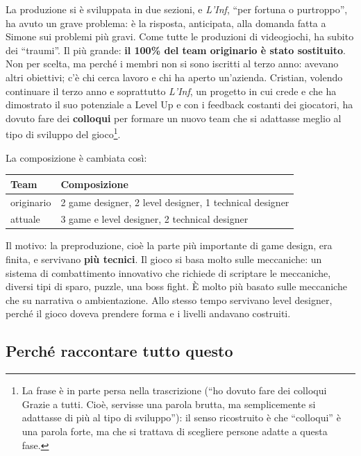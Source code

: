 La produzione si è sviluppata in due sezioni, e \emph{L'Inf}, ``per fortuna o
purtroppo'', ha avuto un grave problema: è la risposta, anticipata, alla
domanda fatta a Simone sui problemi più gravi. Come tutte le produzioni di
videogiochi, ha subito dei ``traumi''. Il più grande: \textbf{il 100\% del
team originario è stato sostituito}. Non per scelta, ma perché i membri non si
sono iscritti al terzo anno: avevano altri obiettivi; c'è chi cerca lavoro e
chi ha aperto un'azienda. Cristian, volendo continuare il terzo anno e
soprattutto \emph{L'Inf}, un progetto in cui crede e che ha dimostrato il suo
potenziale a Level Up e con i feedback costanti dei giocatori, ha dovuto fare
dei \textbf{colloqui} per formare un nuovo team che si adattasse meglio al tipo
di sviluppo del gioco\footnote{La frase è in parte persa nella trascrizione
(``ho dovuto fare dei colloqui Grazie a tutti. Cioè, servisse una parola
brutta, ma semplicemente si adattasse di più al tipo di sviluppo''): il
senso ricostruito è che ``colloqui'' è una parola forte, ma che si trattava
di scegliere persone adatte a questa fase.}.

La composizione è cambiata così:
\begin{center}
  \begin{tabular}{@{}lp{}@{}}
    \toprule
    \textbf{Team} & \textbf{Composizione} \\
    \midrule
    originario & 2 game designer, 2 level designer, 1 technical designer \\
    attuale    & 3 game e level designer, 2 technical designer \\
    \bottomrule
  \end{tabular}
\end{center}
Il motivo: la preproduzione, cioè la parte più importante di game design, era
finita, e servivano \textbf{più tecnici}. Il gioco si basa molto sulle
meccaniche: un sistema di combattimento innovativo che richiede di scriptare
le meccaniche, diversi tipi di sparo, puzzle, una boss fight. È molto più
basato sulle meccaniche che su narrativa o ambientazione. Allo stesso tempo
servivano level designer, perché il gioco doveva prendere forma e i livelli
andavano costruiti.

\subsection{Perché raccontare tutto questo}

